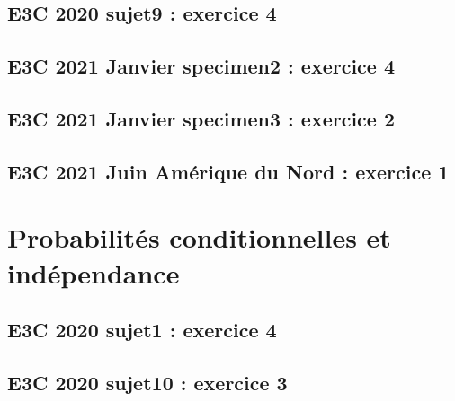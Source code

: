 \documentclass[lang=fr,edition=teacher,layout=sheet]{mxbook}
\begin{document}
\begingroup\endgroup
\par\bigskip
{}\subsection*{E3C 2020 sujet9 : exercice 4}
\begingroup\endgroup
\par\bigskip
{}\subsection*{E3C 2021 Janvier specimen2 : exercice 4}
\begingroup\endgroup
\par\bigskip
{}\subsection*{E3C 2021 Janvier specimen3 : exercice 2}
\begingroup\endgroup
\par\bigskip
{}\subsection*{E3C 2021 Juin Amérique du Nord : exercice 1}
\begingroup\endgroup
\par\bigskip
\clearpage\section*{Probabilités conditionnelles et indépendance}
\subsection*{E3C 2020 sujet1 : exercice 4}
\begingroup\endgroup
\par\bigskip
{}\subsection*{E3C 2020 sujet10 : exercice 3}
\begingroup\endgroup
\par\bigskip
\end{document}
